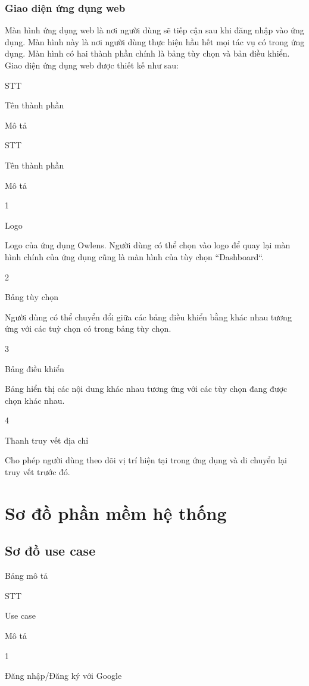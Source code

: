 \subsubsection{Giao diện ứng dụng web}

\tab Màn hình ứng dụng web là nơi người dùng sẽ tiếp cận sau khi đăng nhập vào ứng dụng. 
Màn hình này là nơi người dùng thực hiện hầu hết mọi tác vụ có trong ứng dụng.
Màn hình có hai thành phần chính là bảng tùy chọn và bản điều khiển.
Giao diện ứng dụng web được thiết kế như sau:

STT

Tên thành phần

Mô tả

STT

Tên thành phần

Mô tả

1

Logo

Logo của ứng dụng Owlens. Người dùng có thể chọn vào logo để quay lại màn hình chính của ứng dụng cũng là màn hình của tùy chọn “Dashboard“.

2

Bảng tùy chọn

Người dùng có thể chuyển đổi giữa các bảng điều khiển bằng khác nhau tương ứng với các tuỳ chọn có trong bảng tùy chọn.

3

Bảng điều khiển

Bảng hiển thị các nội dung khác nhau tương ứng với các tùy chọn đang được chọn khác nhau.

4

Thanh truy vết địa chỉ

Cho phép người dùng theo dõi vị trí hiện tại trong ứng dụng và di chuyển lại truy vết trước đó.

\section{Sơ đồ phần mềm hệ thống}

\subsection{Sơ đồ use case}

Bảng mô tả

STT

Use case

Mô tả

1

Đăng nhập/Đăng ký với Google

